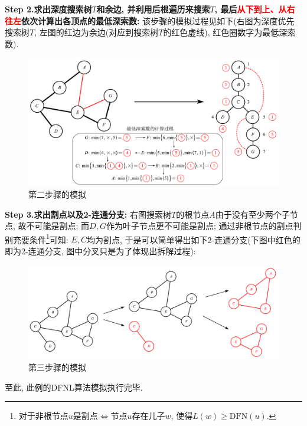 \documentclass{article}
\begin{document}
\begin{homeworkProblem}
	\textbf{Step 2.求出深度搜索树$T$和余边, 并利用后根遍历来搜索$T$, 最后\textcolor{red}{从下到上、从右往左}依次计算出各顶点的最低深索数:} 该步骤的模拟过程见如下(右图为深度优先搜索树$T$, 左图的红边为余边(对应到搜索树$T$的红色虚线), 红色圈数字为最低深索数).
	\begin{figure}[H]  %
		\centering
		\includegraphics[width=1.0\textwidth]{images/title/最低深索数求解.pdf}
		\caption{第二步骤的模拟}
		\label{fig:第二步骤的模拟}
	\end{figure}

	\textbf{Step 3.求出割点以及2-连通分支:} 右图搜索树$T$的根节点$A$由于没有至少两个子节点, 故不可能是割点; 而$D,G$作为叶子节点更不可能是割点; 通过非根节点的割点判别充要条件\footnote{对于非根节点$u$是割点$\Leftrightarrow $节点$u$存在儿子$w$, 使得$L(w)\geq \text{DFN}(u)$.}可知: $E,C$均为割点, 于是可以简单得出如下2-连通分支(下图中红色的即为2-连通分支, 图中分叉只是为了体现出拆解过程):
	\begin{figure}[H]  %
		\centering
		\includegraphics[width=1.0\textwidth]{images/title/2-连通分支.pdf}
		\caption{第三步骤的模拟}
		\label{fig:第三步骤的模拟}
	\end{figure}

	至此, 此例的DFNL算法模拟执行完毕.

	\newpage

\end{homeworkProblem}
\end{document}
